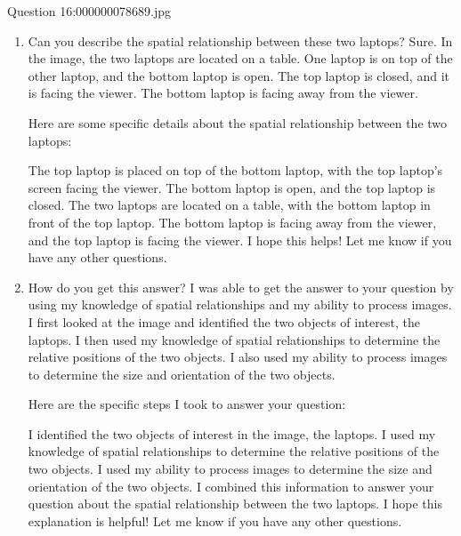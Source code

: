     Question 16:000000078689.jpg
    \begin{enumerate}
        \item Can you describe the spatial relationship between these two laptops?
        \subitem 
        Sure. In the image, the two laptops are located on a table. One laptop is on top of the other laptop, and the bottom laptop is open. The top laptop is closed, and it is facing the viewer. The bottom laptop is facing away from the viewer.
        
        Here are some specific details about the spatial relationship between the two laptops:
        
        The top laptop is placed on top of the bottom laptop, with the top laptop's screen facing the viewer.
        The bottom laptop is open, and the top laptop is closed.
        The two laptops are located on a table, with the bottom laptop in front of the top laptop.
        The bottom laptop is facing away from the viewer, and the top laptop is facing the viewer.
        I hope this helps! Let me know if you have any other questions.
        \item How do you get this answer?
        \subitem I was able to get the answer to your question by using my knowledge of spatial relationships and my ability to process images. I first looked at the image and identified the two objects of interest, the laptops. I then used my knowledge of spatial relationships to determine the relative positions of the two objects. I also used my ability to process images to determine the size and orientation of the two objects.
        
        Here are the specific steps I took to answer your question:
        
        I identified the two objects of interest in the image, the laptops.
        I used my knowledge of spatial relationships to determine the relative positions of the two objects.
        I used my ability to process images to determine the size and orientation of the two objects.
        I combined this information to answer your question about the spatial relationship between the two laptops.
        I hope this explanation is helpful! Let me know if you have any other questions.
    \end{enumerate}
